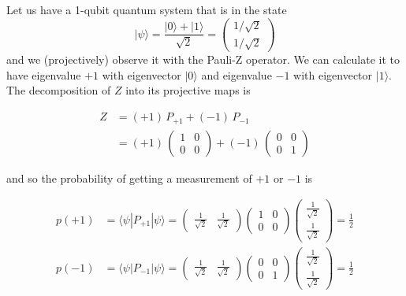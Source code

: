 \documentclass{article}
\newcounter{example}[section]
\begin{document}
      \begin{example}
        \label{ex:basic-measurement-of-a-qubit}
        Let us have a 1-qubit quantum system that is in the state
        \begin{equation}
          |\psi \rangle = \frac{|0\rangle + |1 \rangle}{\sqrt{2}} = \begin{pmatrix} 1/\sqrt{2} \\ 1/\sqrt{2} \end{pmatrix}
        \end{equation}
        and we (projectively) observe it with the Pauli-Z operator. We can calculate it to have eigenvalue $+1$ with eigenvector $|0\rangle$ and eigenvalue $-1$ with eigenvector $|1\rangle$. The decomposition of $Z$ into its projective maps is

        \begin{align*}
          Z & = (+1) \, P_{+1} + (-1)\, P_{-1} \\
          & = (+1) \, \begin{pmatrix} 1&0\\0&0 \end{pmatrix} + (-1)\, \begin{pmatrix} 0&0\\0&1 \end{pmatrix}
        \end{align*}

        and so the probability of getting a measurement of $+1$ or $-1$ is

        \begin{align*}
          p(+1) & = \langle \psi | P_{+1} | \psi \rangle = \begin{pmatrix} \frac{1}{\sqrt{2}} & \frac{1}{\sqrt{2}} \end{pmatrix} \begin{pmatrix} 1&0\\0&0 \end{pmatrix} \begin{pmatrix} \frac{1}{\sqrt{2}} \\ \frac{1}{\sqrt{2}} \end{pmatrix} = \frac{1}{2} \\
          p(-1) & = \langle \psi | P_{-1} | \psi \rangle = \begin{pmatrix} \frac{1}{\sqrt{2}} & \frac{1}{\sqrt{2}} \end{pmatrix} \begin{pmatrix} 0&0\\0&1 \end{pmatrix} \begin{pmatrix} \frac{1}{\sqrt{2}} \\ \frac{1}{\sqrt{2}} \end{pmatrix} = \frac{1}{2}
        \end{align*}
      \end{example}
\end{document}
